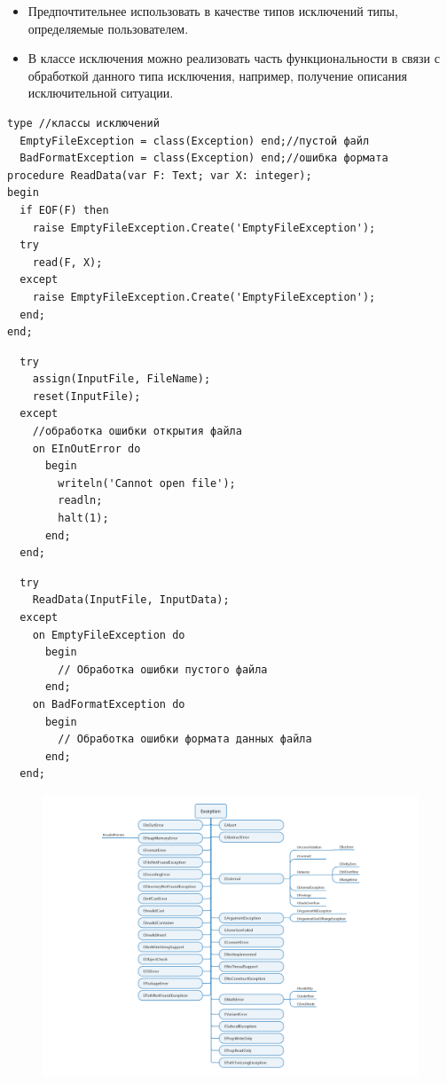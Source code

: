 \documentclass[xcolor=table]{beamer}
\begin{document}
\begin{frame}[fragile]
	\begin{itemize}
		\item Предпочтительнее использовать в качестве типов исключений типы, определяемые пользователем.
		\item В классе исключения можно реализовать часть функциональности в связи с обработкой данного типа исключения, например, получение описания исключительной ситуации.
	\end{itemize}
	\begin{verbatim}
type //классы исключений
  EmptyFileException = class(Exception) end;//пустой файл
  BadFormatException = class(Exception) end;//ошибка формата
procedure ReadData(var F: Text; var X: integer);
begin
  if EOF(F) then 
    raise EmptyFileException.Create('EmptyFileException');
  try 
    read(F, X);
  except
    raise EmptyFileException.Create('EmptyFileException');
  end;
end;
	\end{verbatim}
\end{frame}

\begin{frame}[fragile]
	\begin{verbatim}
  try
    assign(InputFile, FileName);
    reset(InputFile);
  except
    //обработка ошибки открытия файла
    on EInOutError do
      begin
        writeln('Cannot open file');
        readln;
        halt(1);
      end;
  end;
	\end{verbatim}
\end{frame}

\begin{frame}[fragile]
	\begin{verbatim}
  try
    ReadData(InputFile, InputData);
  except
    on EmptyFileException do
      begin
        // Обработка ошибки пустого файла
      end;
    on BadFormatException do
      begin
        // Обработка ошибки формата данных файла
      end;
  end;
	\end{verbatim}
\end{frame}

\begin{frame}
	\begin{figure}[h]
		\centering
		\includegraphics[scale=0.7]{images/lec08-pic08.png}
	\end{figure}
\end{frame}
\end{document}
